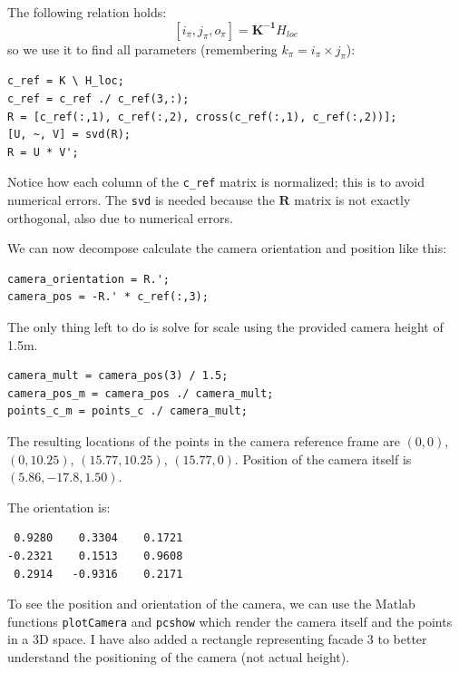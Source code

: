 \documentclass{Configuration_Files/PoliMi3i_thesis}
\begin{document}
The following relation holds:
\[
[i_\pi, j_\pi, o_\pi] = \mathbf{K^{-1}}H_{loc}
\]
so we use it to find all parameters (remembering $k_\pi = i_\pi \times j_\pi$):
\begin{verbatim}
c_ref = K \ H_loc;
c_ref = c_ref ./ c_ref(3,:);
R = [c_ref(:,1), c_ref(:,2), cross(c_ref(:,1), c_ref(:,2))];
[U, ~, V] = svd(R);
R = U * V';
\end{verbatim}
Notice how each column of the \verb|c_ref| matrix is normalized; this is to avoid numerical errors. The \verb|svd| is needed because the $\mathbf{R}$ matrix is not exactly orthogonal, also due to numerical errors.

We can now decompose calculate the camera orientation and position like this:
\begin{verbatim}
camera_orientation = R.';
camera_pos = -R.' * c_ref(:,3);	
\end{verbatim}

The only thing left to do is solve for scale using the provided camera height of 1.5m.
\begin{verbatim}
camera_mult = camera_pos(3) / 1.5;
camera_pos_m = camera_pos ./ camera_mult;
points_c_m = points_c ./ camera_mult;	
\end{verbatim}

The resulting locations of the points in the camera reference frame are $(0, 0)$, $(0, 10.25)$, $(15.77, 10.25)$, $(15.77, 0)$. Position of the camera itself is $(5.86, -17.8, 1.50)$.

The orientation is:
\begin{verbatim}
 0.9280    0.3304    0.1721
-0.2321    0.1513    0.9608
 0.2914   -0.9316    0.2171
\end{verbatim}

To see the position and orientation of the camera, we can use the Matlab functions \verb|plotCamera| and \verb|pcshow| which render the camera itself and the points in a 3D space. I have also added a rectangle representing facade 3 to better understand the positioning of the camera (not actual height).
\end{document}
